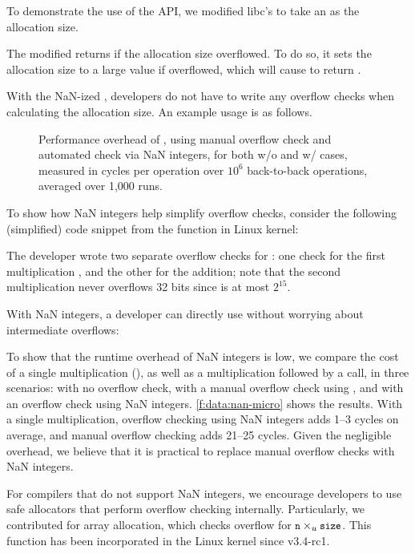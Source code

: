 To demonstrate the use of the API, we modified libc's 
to take an  as the allocation size.

The modified  returns  if the allocation size
overflowed.  To do so, it sets the allocation size to a large value
 if  overflowed, which will cause
 to return .

With the NaN-ized , developers do not have to write any overflow checks
when calculating the allocation size.
An example usage is as follows.


\begin{figure}
\centering

\caption{Performance overhead of ,
using manual overflow check  and
automated check via NaN integers, for both w/o and w/ 
cases, measured in cycles per operation over $10^6$ back-to-back
operations, averaged over 1,000 runs.}
\label{f:data:nan-micro}
\end{figure}

To show how NaN integers help simplify overflow checks,
consider the following (simplified) code snippet from the
 function in Linux kernel:
%

%
The developer wrote two separate overflow checks for
:
one check for the first multiplication , and
the other for the addition;
note that the second multiplication 
never overflows 32 bits since  is at most $2^{15}$.

With NaN integers, a developer can directly use 
without worrying about intermediate overflows:


To show that the runtime overhead of NaN integers is low, we compare
the cost of a single multiplication (), as well as a multiplication
followed by a  call, in three scenarios: with no overflow
check, with a manual overflow check using
, and with an overflow check using
NaN integers.
%
\autoref{f:data:nan-micro} shows the results.
%
With a single multiplication, overflow checking using NaN integers
adds 1--3 cycles on average, and manual overflow checking adds
21--25 cycles.
%
Given the negligible overhead, we believe that it is practical
to replace manual overflow checks with NaN integers.

For compilers that do not support NaN integers, we encourage
developers to use safe allocators that perform overflow checking
internally.  Particularly, we contributed  for array allocation, which checks overflow for $\cc{n}
\times_u \cc{size}$. This function has been incorporated in the Linux kernel
since v3.4-rc1.

